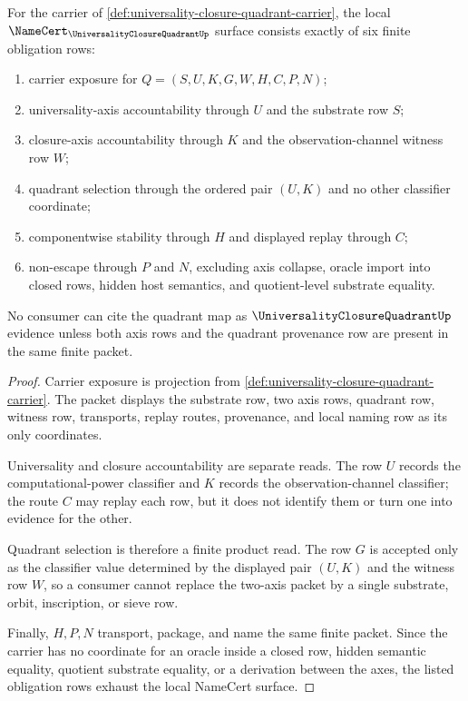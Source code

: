 \begin{theorem}
\label{thm:universality-closure-quadrant-namecert-obligations}
For the carrier of \autoref{def:universality-closure-quadrant-carrier}, the local $\NameCert_{\UniversalityClosureQuadrantUp}$ surface consists exactly of six finite obligation rows:
\begin{enumerate}
\item carrier exposure for $Q=(S,U,K,G,W,H,C,P,N)$;
\item universality-axis accountability through $U$ and the substrate row $S$;
\item closure-axis accountability through $K$ and the observation-channel witness row $W$;
\item quadrant selection through the ordered pair $(U,K)$ and no other classifier coordinate;
\item componentwise stability through $H$ and displayed replay through $C$;
\item non-escape through $P$ and $N$, excluding axis collapse, oracle import into closed rows, hidden host semantics, and quotient-level substrate equality.
\end{enumerate}
No consumer can cite the quadrant map as $\UniversalityClosureQuadrantUp$ evidence unless both axis rows and the quadrant provenance row are present in the same finite packet.
\end{theorem}
\begin{proof}
Carrier exposure is projection from \autoref{def:universality-closure-quadrant-carrier}. The packet displays the substrate row, two axis rows, quadrant row, witness row, transports, replay routes, provenance, and local naming row as its only coordinates.

Universality and closure accountability are separate reads. The row $U$ records the computational-power classifier and $K$ records the observation-channel classifier; the route $C$ may replay each row, but it does not identify them or turn one into evidence for the other.

Quadrant selection is therefore a finite product read. The row $G$ is accepted only as the classifier value determined by the displayed pair $(U,K)$ and the witness row $W$, so a consumer cannot replace the two-axis packet by a single substrate, orbit, inscription, or sieve row.

Finally, $H,P,N$ transport, package, and name the same finite packet. Since the carrier has no coordinate for an oracle inside a closed row, hidden semantic equality, quotient substrate equality, or a derivation between the axes, the listed obligation rows exhaust the local NameCert surface.
\end{proof}


